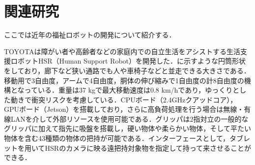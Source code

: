 
\section{関連研究}
ここでは近年の福祉ロボットの開発について紹介する．

TOYOTAは障がい者や高齢者などの家庭内での自立生活をアシストする生活支援ロボットHSR（Human Support Robot）を開発した\cite{HSR2019}．に示すような円筒形状をしており，廊下など狭い通路でも人や車椅子などと並走できる大きさである．移動用で3自由度，アームで4自由度，胴体の伸び縮みで1自由度の計8自由度の機構となっている．重量は37 kgで最大移動速度は0.8 km/hであり，ゆっくりとした動きで衝突リスクを考慮している．CPUボード（2.4GHzクアッドコア），GPUボード（Jetson）を搭載しており，さらに高負荷処理を行う場合は無線・有線LANを介して外部リソースを使用可能である．グリッパは2指対立の一般的なグリッパに加えて指先に吸盤を搭載し，硬い物体や柔らかい物体，そして平たい物体を含む43種類の物体の把持が可能である．インターフェースとして，タブレットを用いてHSRのカメラに映る遠把持対象物を指定して持って来させることができる．

